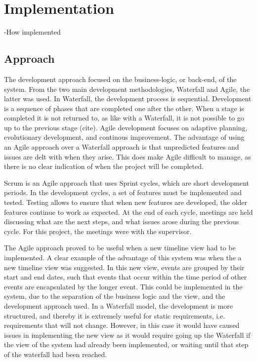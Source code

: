 \chapter{Implementation}
-How implemented
\section{Approach}
\par The development approach focused on the business-logic, or back-end, of the system. From the two main development methodologies, Waterfall and Agile, the latter was used. In Waterfall, the development process is sequential. Development is a sequence of phases that are completed one after the other. When a stage is completed it is not returned to, as like with a Waterfall, it is not possible to go up to the previous stage (cite). Agile development focuses on adaptive planning, evolutionary development, and continous improvement. The advantage of using an Agile approach over a Waterfall approach is that unpredicted features and issues are delt with when they arise. This does make Agile difficult to manage, as there is no clear indication of when the project will be completed.
 
\par Scrum is an Agile approach that uses Sprint cycles, which are short development periods. In the development cycles, a set of features must be implemented and tested. Testing allows to ensure that when new features are developed, the older features continue to work as expected. At the end of each cycle, meetings are held discussing what are the next steps, and what issues arose during the previous cycle. For this project, the meetings were with the supervisor.
 
\par The Agile approach proved to be useful when a new timeline view had to be implemented. A clear example of the advantage of this system was when the a new timeline view was suggested. In this new view, events are grouped by their start and end dates, such that events that occur within the time period of other events are encapsulated by the longer event. This could be implemented in the system, due to the separation of the business logic and the view, and the development approach used. In a Waterfall model, the development is more structured, and thereby it is extremely useful for static requirements, i.e. requirements that will not change. However, in this case it would have caused issues in implementing the new view as it would require going up the Waterfall if the view of the system had already been implemented, or waiting until that step of the waterfall had been reached.

